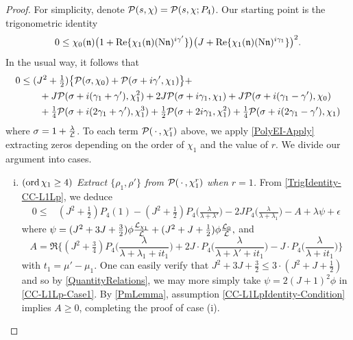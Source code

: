 \documentclass[12pt,psamsfonts]{amsart}
\theoremstyle{definition}
\theoremstyle{remark}
\numberwithin{equation}{section}
\begin{document}
\begin{proof} For simplicity, denote $\mathcal{P}(s,\chi) = \mathcal{P}(s,\chi; P_4)$. Our starting point is the  trigonometric identity
\[
0 \leq  \chi_0(\mathfrak{n}) \big(1 + \mathrm{Re}\{ \chi_1(\mathfrak{n}) (\mathrm{N}\mathfrak{n})^{i\gamma'} \} \big) \big( J+ \mathrm{Re}\{ \chi_1(\mathfrak{n}) (\mathrm{N}\mathfrak{n})^{i\gamma_1} \} \big)^2.
\]
In the usual way, it follows that
\begin{equation}
\begin{aligned}
0 & \leq(J^2+\tfrac{1}{2}) \big\{ \mathcal{P}(\sigma, \chi_0)  + \mathcal{P}(\sigma+i\gamma', \chi_1) \big\} + \\
& \qquad + J \mathcal{P}(\sigma + i(\gamma_1+\gamma'), \chi_1^2) + 2J \mathcal{P}(\sigma+i\gamma_1, \chi_1) + J \mathcal{P}(\sigma+i(\gamma_1-\gamma'), \chi_0) \\
& \qquad + \tfrac{1}{4} \mathcal{P}(\sigma + i(2\gamma_1+\gamma'), \chi_1^3) + \tfrac{1}{2} \mathcal{P}(\sigma+2i\gamma_1, \chi_1^2) + \tfrac{1}{4} \mathcal{P}(\sigma+i(2\gamma_1-\gamma'), \chi_1) \\
\end{aligned} 
\label{TrigIdentity-CC-L1Lp}
\end{equation}
where $\sigma = 1 + \tfrac{\lambda}{\mathcal{L}}$. To each term $\mathcal{P}( \, \cdot \, , \chi_1^r)$ above, we apply \cref{PolyEI-Apply} extracting zeros depending on the order of $\chi_1$ and the value of $r$.   We divide our argument into cases. 
\begin{enumerate}[(i)]
	\item $(\mathrm{ord}\, \chi_1 \geq 4)$ \emph{Extract $\{\rho_1, \rho'\}$ from $\mathcal{P}( \, \cdot \, , \chi_1^r)$ when $r=1$.} From \eqref{TrigIdentity-CC-L1Lp}, we deduce
	\begin{equation}
	\begin{aligned}
	0 \leq & (J^2+\tfrac{1}{2}) P_4(1) -  (J^2+\tfrac{1}{2}) P_4\big( \frac{\lambda}{\lambda+\lambda'} \big) - 2J P_4\big( \frac{\lambda}{\lambda+\lambda_1}\big)  -A + \lambda \psi + \epsilon  
	\end{aligned}
	\label{CC-L1Lp-Case1}
	\end{equation}
	where  $\psi = (J^2 + 3J + \tfrac{3}{2}) \phi \tfrac{\mathcal{L}_{\chi_1}}{\mathcal{L}} + (J^2 + J + \tfrac{1}{2}) \phi \tfrac{\mathcal{L}_0}{\mathcal{L}},$ and
	\[
	A =  \Re\Big\{  (J^2+\tfrac{3}{4}) P_4\big( \frac{\lambda}{\lambda+\lambda_1+it_1} \big) + 2J \cdot P_4\big( \frac{\lambda}{\lambda+\lambda' + it_1}\big) - J \cdot P_4\big( \frac{\lambda}{\lambda+it_1}\big)\Big\}
	\]
	with $t_1 = \mu' - \mu_1$. One can easily verify that $J^2 + 3J+\tfrac{3}{2} \leq 3 \cdot(J^2 + J +\tfrac{1}{2})$ and so by \cref{QuantityRelations}, we may  more simply take $\psi =  2(J+1)^2 \phi$ in \eqref{CC-L1Lp-Case1}. By \cref{PmLemma}, assumption \eqref{CC-L1LpIdentity-Condition} implies $A \geq 0$, completing the proof of case (i). 
	\\
	

\end{enumerate}
\end{proof}
\end{document}

